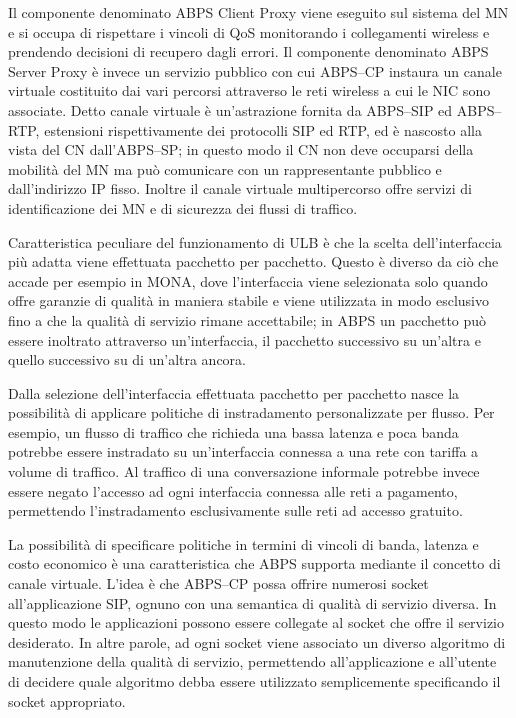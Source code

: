 \documentclass[12pt,a4paper,openright,twoside]{book}
\begin{document}
Il componente denominato ABPS Client Proxy viene eseguito sul sistema
del MN e si occupa di rispettare i vincoli di QoS monitorando i
collegamenti wireless e prendendo decisioni di recupero dagli
errori. Il componente denominato ABPS Server Proxy è invece un
servizio pubblico con cui ABPS--CP instaura un canale virtuale
costituito dai vari percorsi attraverso le reti wireless a cui le NIC
sono associate. Detto canale virtuale è un'astrazione fornita da
ABPS--SIP ed ABPS--RTP, estensioni rispettivamente dei protocolli SIP
ed RTP, ed è nascosto alla vista del CN dall'ABPS--SP; in questo modo
il CN non deve occuparsi della mobilità del MN ma può comunicare con
un rappresentante pubblico e dall'indirizzo IP fisso. Inoltre il
canale virtuale multipercorso offre servizi di identificazione dei MN
e di sicurezza dei flussi di traffico.

Caratteristica peculiare del funzionamento di ULB è che la scelta
dell'interfaccia più adatta viene effettuata pacchetto per
pacchetto. Questo è diverso da ciò che accade per esempio in MONA,
dove l'interfaccia viene selezionata solo quando offre garanzie di
qualità in maniera stabile e viene utilizzata in modo esclusivo fino a
che la qualità di servizio rimane accettabile; in ABPS un pacchetto
può essere inoltrato attraverso un'interfaccia, il pacchetto
successivo su un'altra e quello successivo su di un'altra ancora.

Dalla selezione dell'interfaccia effettuata pacchetto per pacchetto
nasce la possibilità di applicare politiche di instradamento
personalizzate per flusso. Per esempio, un flusso di traffico che
richieda una bassa latenza e poca banda potrebbe essere instradato su
un'interfaccia connessa a una rete con tariffa a volume di
traffico. Al traffico di una conversazione informale potrebbe invece
essere negato l'accesso ad ogni interfaccia connessa alle reti a
pagamento, permettendo l'instradamento esclusivamente sulle reti ad
accesso gratuito.

La possibilità di specificare politiche in termini di vincoli di
banda, latenza e costo economico è una caratteristica che ABPS
supporta mediante il concetto di canale virtuale. L'idea è che
ABPS--CP possa offrire numerosi socket all'applicazione SIP, ognuno
con una semantica di qualità di servizio diversa. In questo modo le
applicazioni possono essere collegate al socket che offre il servizio
desiderato. In altre parole, ad ogni socket viene associato un diverso
algoritmo di manutenzione della qualità di servizio, permettendo
all'applicazione e all'utente di decidere quale algoritmo debba essere
utilizzato semplicemente specificando il socket appropriato.
\end{document}
